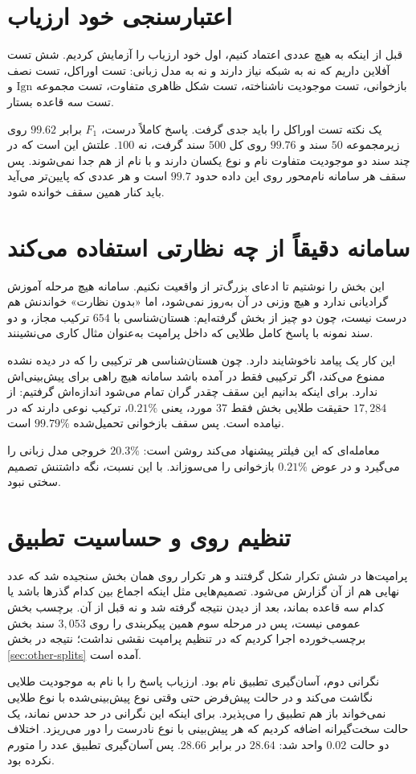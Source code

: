 \section{اعتبارسنجی خود ارزیاب}
\label{sec:evaluator}

قبل از اینکه به هیچ عددی اعتماد کنیم، اول خود ارزیاب را آزمایش کردیم. شش تست آفلاین داریم که نه به شبکه نیاز دارند و نه به مدل زبانی: تست اوراکل، تست نصف بازخوانی، تست موجودیت ناشناخته، تست شکل ظاهری متفاوت، تست مجموعه $\mathrm{Ign}$ و تست سه قاعده بستار.

یک نکته تست اوراکل را باید جدی گرفت. پاسخ کاملاً درست، $F_1$ برابر $99.62$ روی زیرمجموعه $50$ سند و $99.76$ روی کل $500$ سند گرفت، نه $100$. علتش این است که در چند سند دو موجودیت متفاوت نام و نوع یکسان دارند و با نام از هم جدا نمی‌شوند. پس سقف هر سامانه نام‌محور روی این داده حدود $99.7$ است و هر عددی که پایین‌تر می‌آید باید کنار همین سقف خوانده شود.

\section{سامانه دقیقاً از چه نظارتی استفاده می‌کند}
\label{sec:supervision}

این بخش را نوشتیم تا ادعای بزرگ‌تر از واقعیت نکنیم. سامانه هیچ مرحله آموزش گرادیانی ندارد و هیچ وزنی در آن به‌روز نمی‌شود، اما «بدون نظارت» خواندنش هم درست نیست، چون دو چیز از بخش  گرفته‌ایم: هستان‌شناسی با $654$ ترکیب مجاز، و دو سند نمونه با پاسخ کامل طلایی که داخل پرامپت به‌عنوان مثال کاری می‌نشینند.

این کار یک پیامد ناخوشایند دارد. چون هستان‌شناسی هر ترکیبی را که در  دیده نشده ممنوع می‌کند، اگر ترکیبی فقط در  آمده باشد سامانه هیچ راهی برای پیش‌بینی‌اش ندارد. برای اینکه بدانیم این سقف چقدر گران تمام می‌شود اندازه‌اش گرفتیم: از $17{,}284$ حقیقت طلایی بخش  فقط $37$ مورد، یعنی $0.21\%$، ترکیب نوعی دارند که در  نیامده است. پس سقف بازخوانی تحمیل‌شده $99.79\%$ است.

معامله‌ای که این فیلتر پیشنهاد می‌کند روشن است: $20.3\%$ خروجی مدل زبانی را می‌گیرد و در عوض $0.21\%$ بازخوانی را می‌سوزاند. با این نسبت، نگه داشتنش تصمیم سختی نبود.

\section{تنظیم روی  و حساسیت تطبیق}
\label{sec:tuning}

پرامپت‌ها در شش تکرار شکل گرفتند و هر تکرار روی همان بخش  سنجیده شد که عدد نهایی هم از آن گزارش می‌شود. تصمیم‌هایی مثل اینکه اجماع بین کدام گذرها باشد یا کدام سه قاعده بماند، بعد از دیدن نتیجه  گرفته شد و نه قبل از آن. برچسب بخش  عمومی نیست، پس در مرحله سوم همین پیکربندی را روی $3{,}053$ سند بخش  برچسب‌خورده اجرا کردیم که در تنظیم پرامپت نقشی نداشت؛ نتیجه در بخش \ref{sec:other-splits} آمده است.

نگرانی دوم، آسان‌گیری تطبیق نام بود. ارزیاب پاسخ را با نام به موجودیت طلایی نگاشت می‌کند و در حالت پیش‌فرض حتی وقتی نوع پیش‌بینی‌شده با نوع طلایی نمی‌خواند باز هم تطبیق را می‌پذیرد. برای اینکه این نگرانی در حد حدس نماند، یک حالت سخت‌گیرانه اضافه کردیم که هر پیش‌بینی با نوع نادرست را دور می‌ریزد. اختلاف دو حالت $0.02$ واحد شد: $28.64$ در برابر $28.66$. پس آسان‌گیری تطبیق عدد را متورم نکرده بود.
